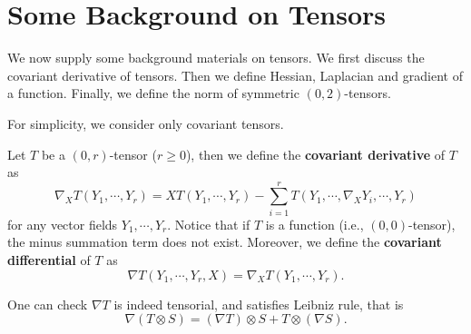 \chapter{Some Background on Tensors}
We now supply some background materials on tensors.
We first discuss the covariant derivative of tensors.
Then we define Hessian, Laplacian and gradient of a function.
Finally, we define the norm of symmetric $(0,2)$-tensors.

For simplicity, we consider only covariant tensors.

\begin{defn}
    Let $T$ be a $(0,r)$-tensor ($r\geq 0$), then we define the \textbf{covariant derivative} of $T$ as
    \[\nabla_XT(Y_1,\cdots,Y_r)=XT(Y_1,\cdots,Y_r)-\sum_{i=1}^rT(Y_1,\cdots,\nabla_XY_i,\cdots,Y_r)\]
    for any vector fields $Y_1,\cdots,Y_r$.
    Notice that if $T$ is a function (i.e., $(0,0)$-tensor), the minus summation term does not exist.
    Moreover, we define the \textbf{covariant differential} of $T$ as
    \[\nabla T(Y_1,\cdots,Y_r,X)=\nabla_XT(Y_1,\cdots,Y_r).\]
\end{defn}

One can check $\nabla T$ is indeed tensorial, and satisfies Leibniz rule, that is
\[\nabla(T\otimes S)=(\nabla T)\otimes S+T\otimes(\nabla S).\]

